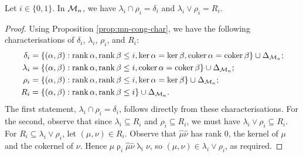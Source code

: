 \begin{lemma}
  \label{lem:mn-lattice-intra}
  Let $i \in \{0, 1\}$.  In $\mathcal{M}_n$, we have $\lambda_i \cap \rho_i = \delta_i$
  and $\lambda_i \vee \rho_i = R_i$.
  \begin{proof}
    Using Proposition \ref{prop:mn-cong-char}, we have the following
    characterisations of $\delta_i$, $\lambda_i$, $\rho_i$, and $R_i$:
    \begin{align*}
      \delta_i &= \{(\alpha,\beta) :
                    \operatorname{rank}\alpha,\operatorname{rank}\beta \leq i,
                    \ker\alpha = \ker\beta,
                    \operatorname{coker}\alpha = \operatorname{coker}\beta\} \cup \Delta_{\mathcal{M}_n}; \\
      \lambda_i &= \{(\alpha,\beta) :
                     \operatorname{rank}\alpha,\operatorname{rank}\beta \leq i,
                     \operatorname{coker}\alpha = \operatorname{coker}\beta\} \cup \Delta_{\mathcal{M}_n}; \\
      \rho_i &= \{(\alpha,\beta) :
                  \operatorname{rank}\alpha,\operatorname{rank}\beta \leq i,
                  \ker\alpha = \ker\beta\} \cup \Delta_{\mathcal{M}_n}; \\
      R_i &= \{(\alpha,\beta) :
               \operatorname{rank}\alpha,\operatorname{rank}\beta \leq i\} \cup \Delta_{\mathcal{M}_n}.
    \end{align*}
    The first statement, $\lambda_i \cap \rho_i = \delta_i$, follows directly
    from these characterisations.  For the second, observe that since
    $\lambda_i \subseteq R_i$ and $\rho_i \subseteq R_i$, we must have
    $\lambda_i \vee \rho_i \subseteq R_i$.  For
    $R_i \subseteq \lambda_i \vee \rho_i$, let $(\mu,\nu) \in R_i$.  Observe
    that $\widehat\mu\widehat\nu$ has rank $0$, the kernel of $\mu$ and the
    cokernel of $\nu$.  Hence
    $\mu \mathrel\rho_i \widehat\mu\widehat\nu \mathrel\lambda_i \nu$, so
    $(\mu, \nu) \in \lambda_i \vee \rho_i$, as required.
  \end{proof}
\end{lemma}

